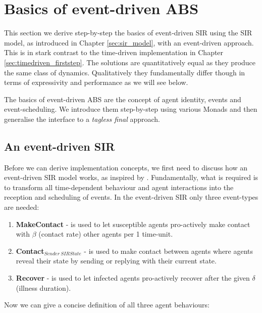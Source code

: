 \section{Basics of event-driven ABS}
This section we derive step-by-step the basics of event-driven SIR using the SIR model, as introduced in Chapter \ref{sec:sir_model}, with an event-driven approach. This is in stark contrast to the time-driven implementation in Chapter \ref{sec:timedriven_firststep}. The solutions are quantitatively equal as they produce the same class of dynamics. Qualitatively they fundamentally differ though in terms of expressivity and performance as we will see below.

The basics of event-driven ABS are the concept of agent identity, events and event-scheduling. We introduce them step-by-step using various Monads and then generalise the interface to a \textit{tagless final} approach. 

\subsection{An event-driven SIR}
Before we can derive implementation concepts, we first need to discuss how an event-driven SIR model works, as inspired by \cite{macal_agent-based_2010}. Fundamentally, what is required is to transform all time-dependent behaviour and agent interactions into the reception and scheduling of events. In the event-driven SIR only three event-types are needed:

\begin{enumerate}
	\item \textbf{MakeContact} - is used to let susceptible agents pro-actively make contact with $\beta$ (contact rate) other agents per 1 time-unit.
	\item \textbf{Contact$_{Sender \  SIRState}$} - is used to make contact between agents where agents reveal their state by sending or replying with their current state.
	\item \textbf{Recover} - is used to let infected agents pro-actively recover after the given $\delta$ (illness duration). 
\end{enumerate}

Now we can give a concise definition of all three agent behaviours:

